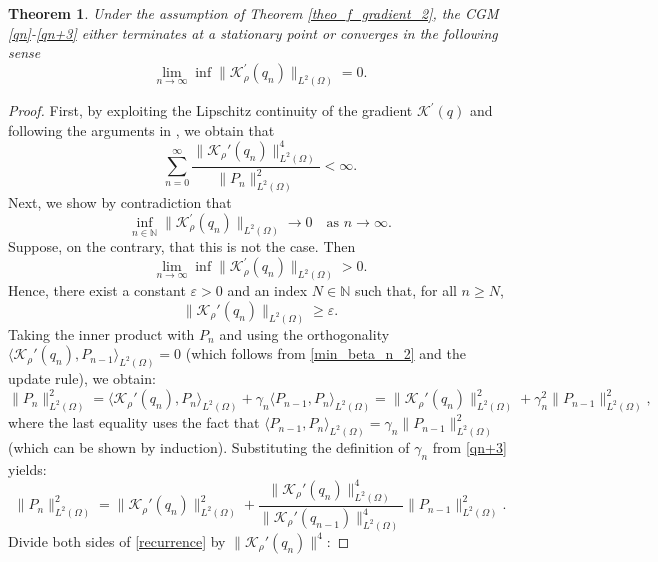 \documentclass[a4paper,12pt,reqno,natbib]{amsart}
\newtheorem{theorem}{Theorem}
\begin{document}
{\begin{theorem}
    Under the assumption of Theorem \ref{theo_f_gradient_2}, the CGM \eqref{qn}-\eqref{qn+3} either terminates at a stationary point or converges in the following sense
    \begin{equation*}
        \lim_{n\to\infty}\inf \|\mathcal{K}^\prime_\rho(q_n) \|_{L^2(\Omega)}=0.
    \end{equation*}
\end{theorem}

\begin{proof}
First, by exploiting the Lipschitz continuity of the gradient $\mathcal{K}^\prime(q)$ 
and following the arguments in \cite{dai1996convergence,fletcher1964function}, 
we obtain that
\begin{equation} \label{key_inequality}
\sum_{n=0}^{\infty} \frac{\|\mathcal{K}_\rho'(q_n)\|_{L^2(\Omega)}^4}{\|P_n\|_{L^2(\Omega)}^2} < \infty.
\end{equation}
Next, we show by contradiction that  
\[
\inf_{n \in \mathbb{N}} \|\mathcal{K}_\rho^\prime(q_n)\|_{L^2(\Omega)} \to 0 
\quad \text{as } n \to \infty.
\]  
Suppose, on the contrary, that this is not the case. Then  
\[
\lim_{n \to \infty}\inf \|\mathcal{K}_\rho^\prime(q_n)\|_{L^2(\Omega)} > 0.
\]  
Hence, there exist a constant $\varepsilon > 0$ and an index $N \in \mathbb{N}$ such that, 
for all $n \geq N$, 
\begin{equation} \label{lower_bound}
\|\mathcal{K}_\rho'(q_n)\|_{L^2(\Omega)} \geq \varepsilon.
\end{equation}
Taking the inner product with $P_n$ and using the orthogonality $\langle \mathcal{K}_\rho'(q_n), P_{n-1} \rangle_{L^2(\Omega)} = 0$ (which follows from \eqref{min_beta_n_2} and the update rule), we obtain:
\[
\|P_n\|_{L^2(\Omega)}^2 = \langle \mathcal{K}_\rho'(q_n), P_n \rangle_{L^2(\Omega)} + \gamma_n \langle P_{n-1}, P_n \rangle_{L^2(\Omega)} = \|\mathcal{K}_\rho'(q_n)\|_{L^2(\Omega)}^2 + \gamma_n^2 \|P_{n-1}\|_{L^2(\Omega)}^2,
\]
where the last equality uses the fact that $\langle P_{n-1}, P_n \rangle_{L^2(\Omega)} = \gamma_n \|P_{n-1}\|_{L^2(\Omega)}^2$ (which can be shown by induction). Substituting the definition of $\gamma_n$ from \eqref{qn+3} yields:
\begin{equation} \label{recurrence}
\|P_n\|_{L^2(\Omega)}^2 = \|\mathcal{K}_\rho'(q_n)\|_{L^2(\Omega)}^2 + \frac{\|\mathcal{K}_\rho'(q_n)\|_{L^2(\Omega)}^4}{\|\mathcal{K}_\rho'(q_{n-1})\|_{L^2(\Omega)}^4} \|P_{n-1}\|_{L^2(\Omega)}^2.
\end{equation}
Divide both sides of \eqref{recurrence} by $\|\mathcal{K}_\rho'(q_n)\|^4$:

\end{proof}}
\end{document}
